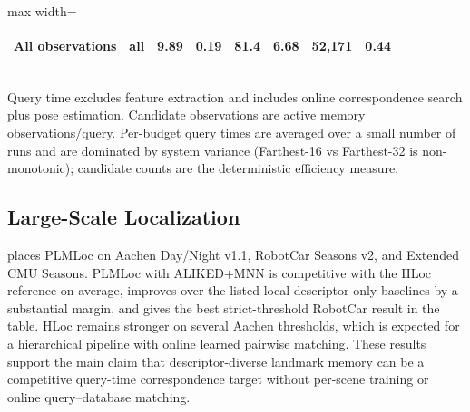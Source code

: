 \documentclass[letterpaper,10 pt,conference]{ieeeconf}
\newcommand{\method}{PLMLoc}
\begin{document}
\begin{table}[!t]
\begin{adjustbox}{max width=\textwidth}
\begin{tabular}{@{}llcccccc@{}}
        All observations      & all   & 9.89 & 0.19 & 81.4 & 6.68 & 52{,}171 & 0.44 \\
        \bottomrule
    \end{tabular}
    \end{adjustbox}
    \\[2pt]
    {Query time excludes feature extraction and includes online correspondence search plus pose estimation. Candidate observations are active memory observations/query. Per-budget query times are averaged over a small number of runs and are dominated by system variance (Farthest-16 vs Farthest-32 is non-monotonic); candidate counts are the deterministic efficiency measure.}
\end{table}

\subsection{Large-Scale Localization}

 places \method{} on Aachen Day/Night v1.1, RobotCar Seasons v2, and Extended CMU Seasons. \method{} with ALIKED+MNN is competitive with the HLoc reference on average, improves over the listed local-descriptor-only baselines by a substantial margin, and gives the best strict-threshold RobotCar result in the table. HLoc remains stronger on several Aachen thresholds, which is expected for a hierarchical pipeline with online learned pairwise matching. These results support the main claim that descriptor-diverse landmark memory can be a competitive query-time correspondence target without per-scene training or online query--database matching.
\end{document}
